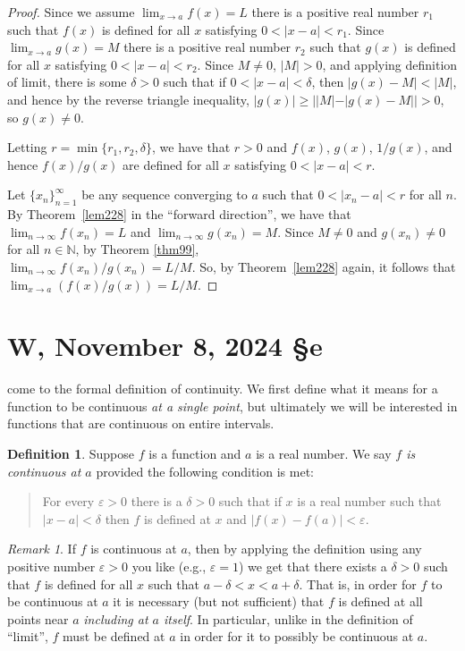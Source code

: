 \documentclass[12pt]{amsart}
\def\d{\delta}
\def\e{\varepsilon}
\newcommand{\N}{\mathbb{N}}
\numberwithin{equation}{section}
\theoremstyle{plain} %
\newcommand{\Nov}[3]{\section{#2, November #1, 2024 \quad \S#3}}
\theoremstyle{definition}
\newtheorem{defn}[equation]{Definition}
\theoremstyle{remark}
\newtheorem{rem}[equation]{Remark}
\begin{document}
\begin{enumerate}
\begin{framed}
\begin{proof}
Since we assume
	${\lim_{x \to a} f(x) = L}$ there is a positive real number $r_1$ such that $f(x)$ is defined for all $x$ satisfying $0 < |x-a| < r_1$.
Since
	$\lim_{x \to a} g(x) = M$ there is a positive real number $r_2$ such that $g(x)$ is defined for all $x$ satisfying $0 < |x-a| < r_2$. Since $M\neq 0$, $|M|>0$, and applying definition of limit, there is some $\delta>0$ such that if $0<|x-a| < \delta$, then $|g(x)-M|<|M|$, and hence by the reverse triangle inequality, $|g(x)| \geq | |M| - |g(x)-M| | >0$, so $g(x)\neq 0$. 
	
	Letting $r = \min\{r_1, r_2,\delta\}$,
	we have that $r > 0$ and $f(x)$, $g(x)$, $1/g(x)$, and hence $f(x)/g(x)$ are defined for all $x$ satisfying $0 < |x-a| < r$. 	
	
	Let $\{x_n\}_{n=1}^\infty$ be any sequence converging to $a$ such that  ${0 < |x_n -a| < r}$ for all $n$. 
	By  Theorem~\ref{lem228} in the ``forward direction'', we have that  $\lim_{n \to \infty} f(x_n) = L$ and $\lim_{n \to \infty} g(x_n) = M$. Since $M\neq 0$ and $g(x_n)\neq 0$ for all $n\in \N$, by Theorem \ref{thm99}, \\
	${\lim_{n \to \infty} f(x_n) /g(x_n) = L / M}$. 
	So, by  Theorem~\ref{lem228} again, it follows that
	$\lim_{x \to a} (f(x) / g(x)) = L / M$.
\end{proof}
\end{framed}
\end{enumerate}


\Nov{8}

We come to the formal definition of continuity. We first define what it means for a function to be continuous {\em at a single point}, but ultimately we will be
interested in functions that are continuous on entire intervals.

\begin{defn} Suppose $f$ is a function and $a$ is a real number.
  We say {\em $f$ is
    continuous at $a$} provided the following condition is met:
\begin{quote}
For every $\e > 0$ there is a $\d > 0$ such that if $x$ is a real
number such that $|x - a| < \d$ then $f$ is defined at $x$ and $|f(x) - f(a)| < \e$.
\end{quote}
\end{defn}

\begin{rem} If $f$ is continuous at $a$, then by applying the definition using any positive number $\e > 0$ you like (e.g., $\e = 1$) we get that  
there exists a $\d> 0$ such that $f$ is defined for all $x$ such that $a-\d < x < a+\d$. That is, in order for $f$ to be continuous at $a$ it is necessary (but not sufficient) that $f$ is defined at all points near $a$ {\em including at $a$ itself}.
In particular, unlike in the
  definition of ``limit'', $f$ must be defined at $a$ in order for it to possibly be continuous at $a$.
\end{rem}
\end{document}

